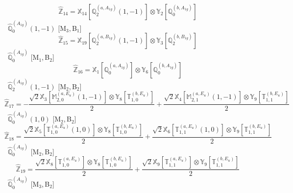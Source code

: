 \documentclass[fleqn,10pt,landscape]{article}
\begin{document}
\begin{itemize}
\begin{dmath*}
\hat{\mathbb{Z}}_{14}=\mathbb{X}_{14}[\mathbb{Q}_{2}^{(a,A_{1g})}(1,-1)] \otimes\mathbb{Y}_{2}[\mathbb{Q}_{0}^{(b,A_{1g})}]
\end{dmath*}
\vspace{4mm}
\noindent {} $\,\,\,\hat{\mathbb{Q}}_{0}^{(A_{1g})}(1,-1)$ [M$_{3}$,\,B$_{1}$]
\begin{dmath*}
\hat{\mathbb{Z}}_{15}=\mathbb{X}_{19}[\mathbb{Q}_{2}^{(a,B_{1g})}(1,-1)] \otimes\mathbb{Y}_{3}[\mathbb{Q}_{2}^{(b,B_{1g})}]
\end{dmath*}
\vspace{4mm}
\noindent {} $\,\,\,\hat{\mathbb{Q}}_{0}^{(A_{1g})}$ [M$_{1}$,\,B$_{2}$]
\begin{dmath*}
\hat{\mathbb{Z}}_{16}=\mathbb{X}_{1}[\mathbb{Q}_{0}^{(a,A_{1g})}] \otimes\mathbb{Y}_{6}[\mathbb{Q}_{0}^{(b,A_{1g})}]
\end{dmath*}
\vspace{4mm}
\noindent {} $\,\,\,\hat{\mathbb{Q}}_{2}^{(A_{1g})}(1,-1)$ [M$_{2}$,\,B$_{2}$]
\begin{dmath*}
\hat{\mathbb{Z}}_{17}=- \frac{\sqrt{2} \mathbb{X}_{3}[\mathbb{M}_{2,0}^{(a,E_{u})}(1,-1)] \otimes\mathbb{Y}_{8}[\mathbb{T}_{1,0}^{(b,E_{u})}]}{2} + \frac{\sqrt{2} \mathbb{X}_{4}[\mathbb{M}_{2,1}^{(a,E_{u})}(1,-1)] \otimes\mathbb{Y}_{9}[\mathbb{T}_{1,1}^{(b,E_{u})}]}{2}
\end{dmath*}
\vspace{4mm}
\noindent {} $\,\,\,\hat{\mathbb{Q}}_{0}^{(A_{1g})}(1,0)$ [M$_{2}$,\,B$_{2}$]
\begin{dmath*}
\hat{\mathbb{Z}}_{18}=\frac{\sqrt{2} \mathbb{X}_{5}[\mathbb{T}_{1,0}^{(a,E_{u})}(1,0)] \otimes\mathbb{Y}_{8}[\mathbb{T}_{1,0}^{(b,E_{u})}]}{2} + \frac{\sqrt{2} \mathbb{X}_{6}[\mathbb{T}_{1,1}^{(a,E_{u})}(1,0)] \otimes\mathbb{Y}_{9}[\mathbb{T}_{1,1}^{(b,E_{u})}]}{2}
\end{dmath*}
\vspace{4mm}
\noindent {} $\,\,\,\hat{\mathbb{Q}}_{0}^{(A_{1g})}$ [M$_{2}$,\,B$_{2}$]
\begin{dmath*}
\hat{\mathbb{Z}}_{19}=\frac{\sqrt{2} \mathbb{X}_{8}[\mathbb{T}_{1,0}^{(a,E_{u})}] \otimes\mathbb{Y}_{8}[\mathbb{T}_{1,0}^{(b,E_{u})}]}{2} + \frac{\sqrt{2} \mathbb{X}_{9}[\mathbb{T}_{1,1}^{(a,E_{u})}] \otimes\mathbb{Y}_{9}[\mathbb{T}_{1,1}^{(b,E_{u})}]}{2}
\end{dmath*}
\vspace{4mm}
\noindent {} $\,\,\,\hat{\mathbb{Q}}_{0}^{(A_{1g})}$ [M$_{3}$,\,B$_{2}$]

\end{itemize}
\end{document}
